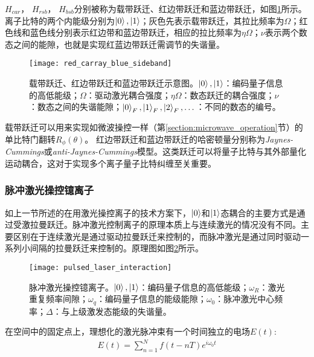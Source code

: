 $H_{car}$， $H_{rsb}$， $H_{bsb}$分别被称为载带跃迁、红边带跃迁和蓝边带跃迁，如图\ref{fig:red_carray_blue_sideband}所示。离子比特的两个内能级分别为$\ket{0},\ket{1}$；灰色先表示载带跃迁，其拉比频率为$\Omega$；红色线和蓝色线分别表示红边带和蓝边带跃迁，相应的拉比频率为$\eta \Omega$；$\nu$表示两个数态之间的能隙，也就是实现红蓝边带跃迁需调节的失谐量。

\begin{figure}
    \centering
    \caption[载带跃迁、红边带跃迁和蓝边带跃迁示意图]{载带跃迁、红边带跃迁和蓝边带跃迁示意图。$\ket{0},\ket{1}$：编码量子信息的高低能级；$\Omega$：驱动激光耦合强度；$\eta \Omega$：数态跃迁的耦合强度；$\nu$：数态之间的失谐能隙；$\ket{0}_F,\ket{1}_F,\ket{2}_F,\dots$：不同的数态的编号。\label{fig:red_carray_blue_sideband}}
    \texttt{[image: red\_carray\_blue\_sideband]}
\end{figure}

载带跃迁可以用来实现如微波操控一样（第\ref{section:microwave_operation}节）的单比特门翻转$R_\phi(\theta)$。
红边带跃迁和蓝边带跃迁的哈密顿量分别称为\emph{Jaynes-Cummings}或\emph{anti-Jaynes-Cummings}模型\cite[]{Karnieli_Fan_2023}。这类跃迁可以将量子比特与其外部量化运动耦合，这对于实现多个离子量子比特纠缠至关重要。


\subsubsection[脉冲激光操控镱离子]{脉冲激光操控镱离子\label{section:pulsed_laser_ion_operation}}
如上一节所述的在用激光操控离子的技术方案下，$\ket{0}$和$\ket{1}$态耦合的主要方式是通过受激拉曼跃迁。脉冲激光控制离子的原理本质上与连续激光的情况没有不同。主要区别在于连续激光是通过驱动拉曼跃迁来控制的，而脉冲激光是通过同时驱动一系列小间隔的拉曼跃迁来控制的。原理图如图\ref{fig:pulsed_laser_interaction}所示。
\begin{figure}
    \centering
    \caption[脉冲激光操控镱离子]{脉冲激光操控镱离子。$\ket{0},\ket{1}$：编码量子信息的高低能级；$\omega_R$：激光重复频率间隙；$\omega_q$：编码量子信息的能级能隙；$\omega_0$：脉冲激光中心频率；$\Delta$：与上级激发态能级的失谐量。\label{fig:pulsed_laser_interaction}}
    \texttt{[image: pulsed\_laser\_interaction]}
\end{figure}

在空间中的固定点上，理想化的激光脉冲束有一个时间独立的电场$E(t)$:
\begin{align}
    E(t)=\sum_{n=1}^{N}f(t-nT)e^{i\omega_0t}
\end{align}


